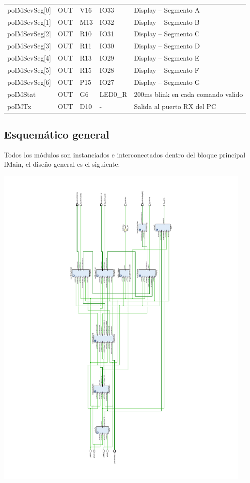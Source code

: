\documentclass[12pt]{article}
\begin{document}
{\begin{tabular}{|p{2.5cm}|p{2.5cm}|p{1.3cm}|p{1.8cm}|p{7.5cm}|}
poIMSevSeg[0] &
OUT &
V16 &
IO33 &
Display – Segmento A
\\

poIMSevSeg[1] &
OUT &
M13 &
IO32 &
Display – Segmento B
\\

poIMSevSeg[2] &
OUT &
R10 &
IO31 &
Display – Segmento C
\\

poIMSevSeg[3] &
OUT &
R11 &
IO30 &
Display – Segmento D
\\

poIMSevSeg[4] &
OUT &
R13 &
IO29 &
Display – Segmento E
\\

poIMSevSeg[5] &
OUT &
R15 &
IO28 &
Display – Segmento F
\\

poIMSevSeg[6] &
OUT &
P15 &
IO27 &
Display – Segmento G
\\

poIMStat &
OUT &
G6 &
LED0\_R &
200ms blink en cada comando valido
\\

poIMTx &
OUT &
D10 &
- &
Salida al puerto RX del PC
\\

\hline
\end{tabular}}


\subsection{Esquemático general}
Todos los módulos son instanciados e interconectados dentro del bloque principal IMain, el diseño general es el siguiente:
 
\includegraphics[width=0.96\textwidth]{Integrador}
\end{document}
